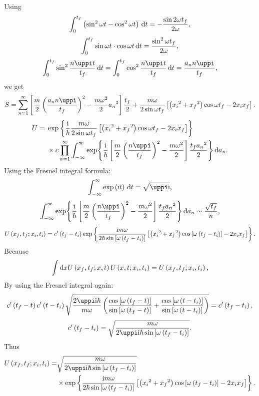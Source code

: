 \documentclass { article }
\begin{document}
Using 
\[\int_0^{t_f}\left(\sin^2\omega t-\cos^2\omega t\right)\,\mathrm{d} t=-\frac{\sin2\omega t_f}{2\omega}\text{,}\]
\[\int_0^{t_f}\sin\omega t\cdot\cos\omega t\,\mathrm{d} t=\frac{\sin^2\omega t_f}{2\omega}\text{,}\]
\[\int_0^{t_f}\sin^2\frac{n\piup t}{t_f} \ndd t=\int_0^{t_f}\cos^2\frac{n\piup t}{t_f} \ndd t=\frac{a_n n \piup}{t_f}\ec\]
we get
\[S=\sum_{n=1}^\infty\left[\frac{m}{2}\lb\frac{a_n n \piup}{t_f}\rb^2-\frac{m\omega^2}{2}{a_n}^2\right]\frac{t_f}{2}+\frac{m\omega}{2\sin\omega t_f}\left[\lb {x_i}^2+{x_f}^2\rb\cos\omega t_f-2 x_i x_f\right]\ed\]
\[\begin{split}U={}&\exp\left\{\frac{\ii}{\hbar}\frac{m\omega}{2\sin\omega t_f}\left[\lb {x_i}^2+{x_f}^2\rb\cos\omega t_f-2 x_i x_f\right]\right\}\\%
&{}\times c\prod_{n=1}^{\infty}\int_{-\infty}^\infty\exp{\frac{\ii}{\hbar}\left[\frac{m}{2}\lb\frac{n \piup}{t_f}\rb^2-\frac{m\omega^2}{2}\right]\frac{t_f {a_n}^2}{2}}\ndd a_n\ed\end{split}\]
Using the Fresnel integral formula:
\[\int_{-\infty}^\infty\exp\lb \ii t\rb\ndd t=\sqrt{\piup \ii}\ec\]
\[\int_{-\infty}^\infty\exp{\frac{\ii}{\hbar}\left[\frac{m}{2}\lb\frac{n \piup}{t_f}\rb^2-\frac{m\omega^2}{2}\right]\frac{t_f {a_n}^2}{2}}\ndd a_n\sim\frac{\sqrt{t_f}}{n}\ec\]
\[U\left( x_f,t_f;x_i,t_i\right)=c'\left( t_f-t_i\right)\exp\left\{\frac{\mathrm{i} m\omega}{2\hbar\sin\left[\omega \left( t_f-t_i\right)\right]}\left[\left( {x_i}^2+{x_f}^2\right)\cos\left[\omega\left( t_f-t_i\right)\right]-2 x_i x_f\right]\right\}\text{.}\]
Because \[\int\dd x U\left( x_f,t_f;x,t\right) U\left( x,t;x_i,t_i\right)=U\left( x_f,t_f;x_i,t_i\right)\text{,}\]
By using the Fresnel integral again:
\[c'\lb t_f-t\rb c'\lb t-t_i\rb\sqrt{\frac{2 \piup \ii \hbar}{m \omega}\lb\frac{\cos\left[\omega\lb t_f-t\rb\right]}{\sin\left[\omega\lb t_f-t\rb\right]}+\frac{\cos\left[\omega\lb t-t_i\rb\right]}{\sin\left[\omega\lb t-t_i\rb\right]}\rb}=c'\lb t_f-t_i\rb\ec\]
\[c'\lb t_f-t_i\rb=\sqrt{\frac{m\omega}{2\piup \ii \hbar\sin\left[\omega\lb t_f-t_i\rb\right]}}\ed\]
Thus
\[\begin{split}U\lb x_f,t_f;x_i,t_i\rb=&\sqrt{\frac{m\omega}{2\piup \ii \hbar\sin\left[\omega\lb t_f-t_i\rb\right]}}\\&{}\times\exp\left\{\frac{\ii m\omega}{2\hbar\sin\left[\omega \lb t_f-t_i\rb\right]}\left[\lb {x_i}^2+{x_f}^2\rb\cos\left[\omega\lb t_f-t_i\rb\right]-2 x_i x_f\right]\right\}\ed\end{split}\]
\end{document}
